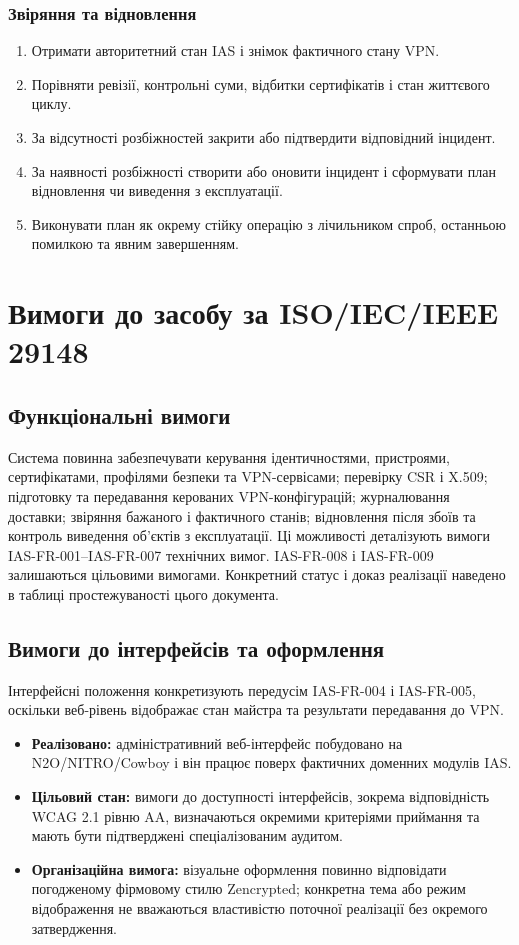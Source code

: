 \documentclass{article}
\begin{document}
\subsubsection{Звіряння та відновлення}
\begin{enumerate}
    \item Отримати авторитетний стан IAS і знімок фактичного стану VPN.
    \item Порівняти ревізії, контрольні суми, відбитки сертифікатів і стан життєвого циклу.
    \item За відсутності розбіжностей закрити або підтвердити відповідний інцидент.
    \item За наявності розбіжності створити або оновити інцидент і сформувати план відновлення чи виведення з експлуатації.
    \item Виконувати план як окрему стійку операцію з лічильником спроб, останньою помилкою та явним завершенням.
\end{enumerate}

\newpage
\section{Вимоги до засобу за ISO/IEC/IEEE 29148}

\subsection{Функціональні вимоги}
Система повинна забезпечувати керування ідентичностями, пристроями, сертифікатами, профілями безпеки та VPN-сервісами; перевірку CSR і X.509; підготовку та передавання керованих VPN-конфігурацій; журналювання доставки; звіряння бажаного і фактичного станів; відновлення після збоїв та контроль виведення об'єктів з експлуатації. Ці можливості деталізують вимоги IAS-FR-001--IAS-FR-007 технічних вимог. IAS-FR-008 і IAS-FR-009 залишаються цільовими вимогами. Конкретний статус і доказ реалізації наведено в таблиці простежуваності цього документа.

\subsection{Вимоги до інтерфейсів та оформлення}
Інтерфейсні положення конкретизують передусім IAS-FR-004 і IAS-FR-005, оскільки веб-рівень відображає стан майстра та результати передавання до VPN.
\begin{itemize}
    \item \textbf{Реалізовано:} адміністративний веб-інтерфейс побудовано на N2O/NITRO/Cowboy і він працює поверх фактичних доменних модулів IAS.
    \item \textbf{Цільовий стан:} вимоги до доступності інтерфейсів, зокрема відповідність WCAG 2.1 рівню AA, визначаються окремими критеріями приймання та мають бути підтверджені спеціалізованим аудитом.
    \item \textbf{Організаційна вимога:} візуальне оформлення повинно відповідати погодженому фірмовому стилю Zencrypted; конкретна тема або режим відображення не вважаються властивістю поточної реалізації без окремого затвердження.
\end{itemize}
\end{document}
